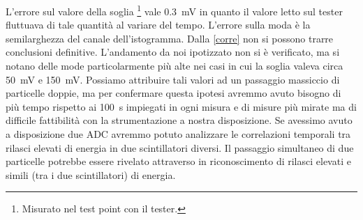 L'errore sul valore della soglia%
\footnote{Misurato nel test point con il tester.}
vale \SI{0.3}{mV} in quanto il valore letto sul tester fluttuava di tale quantità al variare del tempo. L'errore sulla moda è la semilarghezza del canale dell'istogramma.
Dalla \autoref{corre} non si possono trarre conclusioni definitive. L'andamento da noi ipotizzato non si è verificato, ma si notano delle mode particolarmente più alte nei casi in cui la soglia valeva circa \SI{50}{mV} e \SI{150}{mV}. Possiamo attribuire tali valori ad un passaggio massiccio di particelle doppie, ma per confermare questa ipotesi avremmo avuto bisogno di più tempo rispetto ai \SI{100}{s} impiegati in ogni misura e di misure più mirate ma di difficile fattibilità con la strumentazione a nostra disposizione. Se avessimo avuto a disposizione due ADC avremmo potuto analizzare le correlazioni temporali tra rilasci elevati di energia in due scintillatori diversi. Il passaggio simultaneo di due particelle potrebbe essere rivelato attraverso in riconoscimento  di rilasci elevati e simili (tra i due scintillatori) di energia.